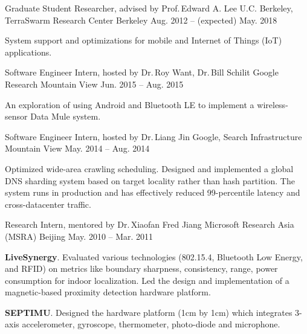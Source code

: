 
\begin{cventries}

  \cventry
  {Graduate Student Researcher, advised by Prof.\,Edward A. Lee}
  {U.C. Berkeley, TerraSwarm Research Center}
  {Berkeley}
  {Aug. 2012 -- (expected) May. 2018}
  {
    \begin{cvitems}
      System support and optimizations for mobile and Internet of Things (IoT)
      applications.
    \end{cvitems}
  }

  \cventry
  {Software Engineer Intern, hosted by Dr.\,Roy Want, Dr.\,Bill Schilit}
  {Google Research}
  {Mountain View}
  {Jun. 2015 -- Aug. 2015}
  {
    \begin{cvitems}
      An exploration of using Android and Bluetooth LE to implement a
      wireless-sensor Data Mule system.
    \end{cvitems}
  }

  \cventry
  {Software Engineer Intern, hosted by Dr.\,Liang Jin}
  {Google, Search Infrastructure}
  {Mountain View}
  {May. 2014 -- Aug. 2014}
  {
    \begin{cvitems}
      Optimized wide-area crawling scheduling. Designed and implemented a global
      DNS sharding system based on target locality rather than hash
      partition. The system runs in production and has effectively reduced
      99-percentile latency and cross-datacenter traffic.
    \end{cvitems}
  }

  \cventry
  {Research Intern, mentored by Dr.\,Xiaofan Fred Jiang}
  {Microsoft Research Asia (MSRA)}
  {Beijing}
  {May. 2010 -- Mar. 2011}
  {
    \begin{cvitems}
      \item \textbf{LiveSynergy}. Evaluated various technologies (802.15.4, Bluetooth
      Low Energy, and RFID) on metrics like boundary sharpness, consistency,
      range, power consumption for indoor localization. Led the design and
      implementation of a magnetic-based proximity detection hardware platform.
      \item \textbf{SEPTIMU}. Designed the hardware platform (1cm by 1cm) which
      integrates 3-axis accelerometer, gyroscope, thermometer, photo-diode and
      microphone.
    \end{cvitems}
  }

\end{cventries}

